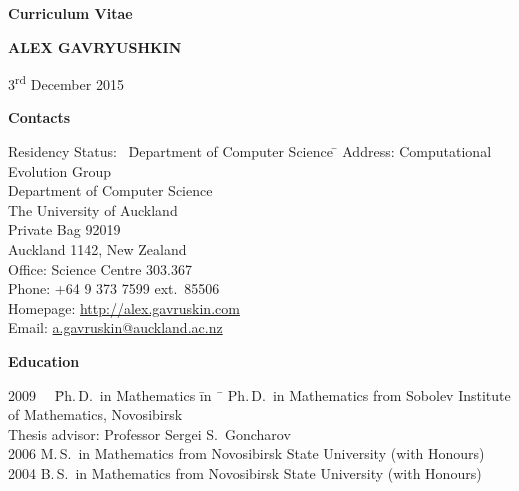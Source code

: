 \documentclass[12pt]{article}
\begin{document}
\centerline{\large \bf Curriculum Vitae}
\vskip5mm
\centerline{\Large \bfseries A\normalsize LEX \Large G\normalsize AVRYUSHKIN}
\vskip5mm
\centerline{3\textsuperscript{rd} December 2015}
\vskip5mm

\centerline{\bf Contacts}
\begin{tabbing}
Residency Status:     \  \= Department of Computer Science \= \kill
Address:        \> Computational Evolution Group \\
		\> Department of Computer Science \\
		\> The University of Auckland\\
		\> Private Bag 92019\\
		\> Auckland 1142, New Zealand\\
Office:		\> Science Centre 303.367\\
Phone:		\> +64 9 373 7599 ext.\ 85506\\
Homepage:	\> \href{http://alex.gavruskin.com}{http://alex.gavruskin.com}\\
Email:		\> \href{mailto:a.gavruskin@auckland.ac.nz}{a.gavruskin@auckland.ac.nz}\\
\iftoggle{full}{
Residency Status: \>New Zealand permanent resident\\
}{}
\iftoggle{dob}{
Date of Birth:	\>  18\textsuperscript{th} January 1983\\
}{}
\end{tabbing}

\centerline{\bf Education}
\begin{tabbing}
2009 \ \ \= Ph.\,D.\ in Mathematics \= in \ \=        \> Ph.\,D.\ in Mathematics \>  from Sobolev Institute of Mathematics, Novosibirsk\\
                \>             \>  Thesis advisor: Professor Sergei S.\ Goncharov\\
2006       \> M.\,S.\ in Mathematics \>  from Novosibirsk State University (with Honours)\\
2004       \> B.\,S.\ in Mathematics \>  from Novosibirsk State University (with Honours)\\
\iftoggle{full}{
2000       \> Gold Medal High School Diploma, Novokuznetsk%
}{}
\iftoggle{dob}{}{\\}
\end{tabbing}
\end{document}
